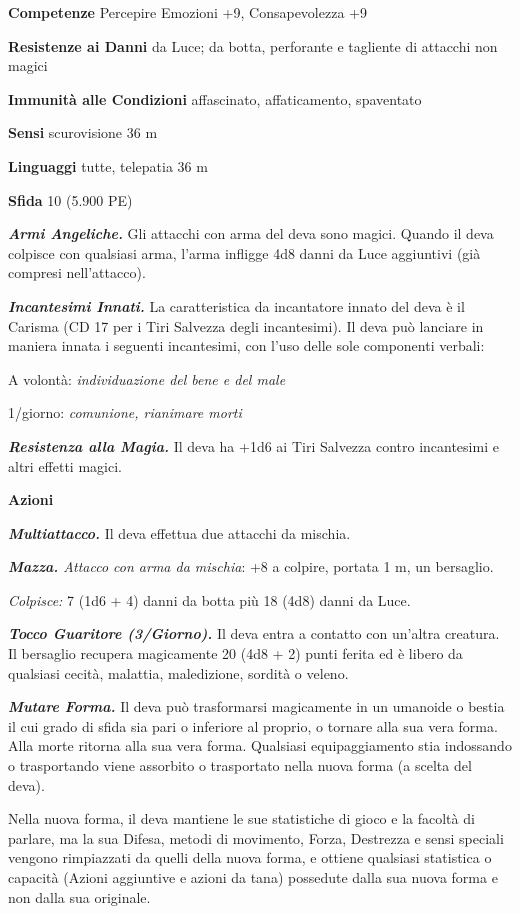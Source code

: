 \begin{multicols}{2}
\textbf{Competenze} Percepire Emozioni +9, Consapevolezza +9

\textbf{Resistenze ai Danni} da Luce; da botta, perforante e tagliente di attacchi non magici

\textbf{Immunità alle Condizioni} affascinato, affaticamento, spaventato

\textbf{Sensi} scurovisione 36 m

\textbf{Linguaggi} tutte, telepatia 36 m

\textbf{Sfida} 10 (5.900 PE)

\emph{\textbf{Armi Angeliche.}} Gli attacchi con arma del deva sono magici. Quando il deva colpisce con qualsiasi arma, l'arma infligge 4d8 danni da Luce aggiuntivi (già compresi nell'attacco).

\emph{\textbf{Incantesimi Innati.}} La caratteristica da incantatore innato del deva è il Carisma (CD 17 per i Tiri Salvezza degli incantesimi). Il deva può lanciare in maniera innata i seguenti incantesimi, con l'uso delle sole componenti verbali: 

A volontà: \emph{individuazione del bene e del male}

1/giorno: \emph{comunione, rianimare morti}

\emph{\textbf{Resistenza alla Magia.}} Il deva ha +1d6 ai Tiri Salvezza contro incantesimi e altri effetti magici.

\textbf{Azioni}

\emph{\textbf{Multiattacco.}} Il deva effettua due attacchi da mischia.

\emph{\textbf{Mazza.} Attacco con arma da mischia}: +8 a colpire, portata 1 m, un bersaglio.

\emph{Colpisce:} 7 (1d6 + 4) danni da botta più 18 (4d8) danni da Luce.

\emph{\textbf{Tocco Guaritore (3/Giorno).}} Il deva entra a contatto con un'altra creatura. Il bersaglio recupera magicamente 20 (4d8 + 2) punti ferita ed è libero da qualsiasi cecità, malattia, maledizione, sordità o veleno.

\emph{\textbf{Mutare Forma.}} Il deva può trasformarsi magicamente in un umanoide o bestia il cui grado di sfida sia pari o inferiore al proprio, o tornare alla sua vera forma. Alla morte ritorna alla sua vera forma. Qualsiasi equipaggiamento stia indossando o trasportando viene assorbito o trasportato nella nuova forma (a scelta del deva).

Nella nuova forma, il deva mantiene le sue statistiche di gioco e la facoltà di parlare, ma la sua Difesa, metodi di movimento, Forza, Destrezza e sensi speciali vengono rimpiazzati da quelli della nuova forma, e ottiene qualsiasi statistica o capacità (Azioni aggiuntive e azioni da tana) possedute dalla sua nuova forma e non dalla sua originale.


\end{multicols}
